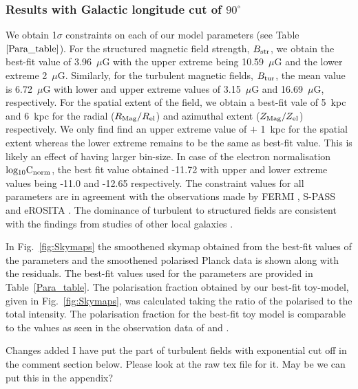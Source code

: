 \documentclass[usenatbib]{mnras}
\newcommand{\Vasu}[1]{{\color{purple}#1}}
\begin{document}
\subsubsection{Results with Galactic longitude cut of $90^\circ$}
We obtain 1$\sigma$ constraints on each of our model parameters (see Table~$\ref{Para_table}$). For the structured magnetic field strength, $B_{\rm str}$, we obtain the best-fit value of 3.96~$\mu$G with the upper extreme being 10.59~$\mu$G and the lower extreme 2~$\mu$G. Similarly, for the turbulent magnetic fields, $B_{\rm tur}$, the mean value is 6.72~$\mu$G with lower and upper extreme values of 3.15~$\mu$G and 16.69~$\mu$G, respectively. For the spatial extent of the field, we obtain a best-fit vale of  5~kpc and 6~kpc for the radial ($R_{\rm Mag}/R_{\rm el}$) and azimuthal extent ($Z_{\rm Mag}/Z_{\rm el}$) respectively. We only find find an upper extreme value of $+$ 1~kpc for the spatial extent whereas the lower extreme remains to be the same as best-fit value. This is likely an effect of having larger bin-size. In case of the electron normalisation $\rm{log_{10}}C_{\rm norm}$, the best fit value obtained -11.72 with upper and lower extreme values being -11.0 and -12.65 respectively. The constraint values for all parameters are in agreement with the observations made by FERMI \citep{Su_2010}, S-PASS \citep{Carretti_2013} and eROSITA \citep{eROSITA}. The dominance of turbulent to structured fields are consistent with the findings from studies of other local galaxies \citep{Beck_NGC_6946,Tabatabaei_2008}.

In Fig.~\ref{fig:Skymaps} the smoothened skymap obtained from the best-fit values of the parameters and the smoothened polarised Planck data is shown along with the residuals. The best-fit values used for the parameters are provided in Table~\ref{Para_table}. 
The polarisation fraction obtained by our best-fit toy-model, given in Fig.~\ref{fig:Skymaps}, was calculated taking the ratio of the polarised to the total intensity. The polarisation fraction for the best-fit toy model is comparable to the values as seen in the observation data of \citet{WMAP_Page} and \citet{Carretti_2013}.

\Vasu{Changes added}
\Vasu{I have put the part of turbulent fields with exponential cut off in the comment section below. Please look at the raw tex file for it. May be we can put this in the appendix?}

\end{document}
